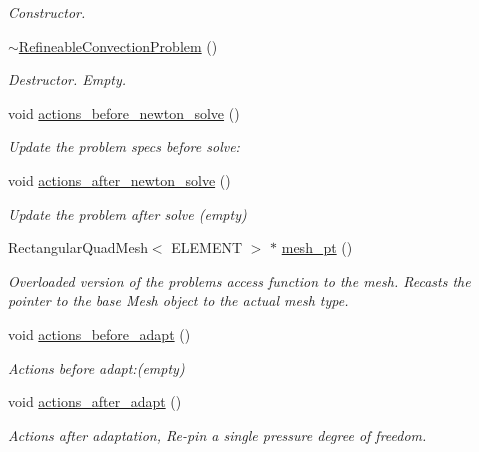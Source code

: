 \begin{DoxyCompactItemize}
\begin{DoxyCompactList}\small\item\em Constructor. \end{DoxyCompactList}\item 
\hyperlink{classRefineableConvectionProblem_a43fc2693230601928578d5b0c6380943}{$\sim$\+Refineable\+Convection\+Problem} ()
\begin{DoxyCompactList}\small\item\em Destructor. Empty. \end{DoxyCompactList}\item 
void \hyperlink{classRefineableConvectionProblem_ae0e627f882cd8faa305392e615331e51}{actions\+\_\+before\+\_\+newton\+\_\+solve} ()
\begin{DoxyCompactList}\small\item\em Update the problem specs before solve\+: \end{DoxyCompactList}\item 
void \hyperlink{classRefineableConvectionProblem_a13bda5e5e75928efa88433902ccab7ee}{actions\+\_\+after\+\_\+newton\+\_\+solve} ()
\begin{DoxyCompactList}\small\item\em Update the problem after solve (empty) \end{DoxyCompactList}\item 
Rectangular\+Quad\+Mesh$<$ E\+L\+E\+M\+E\+NT $>$ $\ast$ \hyperlink{classRefineableConvectionProblem_a837d2412cee6996c78a2d2c5adf720f3}{mesh\+\_\+pt} ()
\begin{DoxyCompactList}\small\item\em Overloaded version of the problem\textquotesingle{}s access function to the mesh. Recasts the pointer to the base Mesh object to the actual mesh type. \end{DoxyCompactList}\item 
void \hyperlink{classRefineableConvectionProblem_a962499683ada1233e20055e46b15fdb0}{actions\+\_\+before\+\_\+adapt} ()
\begin{DoxyCompactList}\small\item\em Actions before adapt\+:(empty) \end{DoxyCompactList}\item 
void \hyperlink{classRefineableConvectionProblem_a9baa484155212df5ad2137dd5a348def}{actions\+\_\+after\+\_\+adapt} ()
\begin{DoxyCompactList}\small\item\em Actions after adaptation, Re-\/pin a single pressure degree of freedom. \end{DoxyCompactList}\item 

\end{DoxyCompactItemize}

